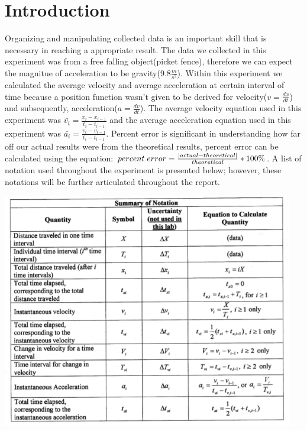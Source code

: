 \documentclass[aps,letterpaper,11pt]{revtex4}
\begin{document}
\section{Introduction}

Organizing and manipulating collected data is an important skill that is necessary in reaching a appropriate result. The data we collected in this experiment was from a free falling object(picket fence), therefore we can expect the magnitue of acceleration to be gravity(9.8$\frac{m}{s^2}$). Within this experiment we calculated the average velocity and average acceleration at certain interval of time because a position function wasn't given to be derived for velocity($v = \frac{dx}{dt}$) and subsequently, acceleration($a = \frac{dv}{dt}$). The average velocity equation used in this experiment was $\bar{v_i}=\frac{x_i-x_{i-1}}{t_i-t_{i-1}}$ and the average acceleration equation used in this experiment was $\bar{a_i}=\frac{v_i-v_{i-1}}{t_i-t_{i-1}}$. Percent error is significant in understanding how far off our actual results were from the theoretical results, percent error can be calculated using the equation: $percent\hspace{1mm}error = \frac{|actual - theoretical|}{theoretical}*100\%$. A list of notation used throughout the experiment is presented below; however, these notations will be further articulated throughout the report.   

\begin{center}
\includegraphics[width=5in]{SummaryOfNotation.png}
\end{center}
\end{document}
